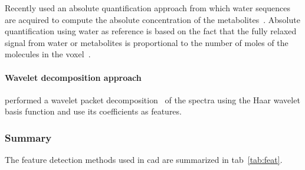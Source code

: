 Recently \citeauthor{trigui2017automatic} used an absolute quantification approach from which water sequences are acquired to compute the absolute concentration of the metabolites~\cite{trigui2016classification,trigui2017automatic}.
Absolute quantification using water as reference is based on the fact that the fully relaxed signal from water or metabolites is proportional to the number of moles of the molecules in the voxel~\cite{gasparovic2006use}.

\paragraph{Wavelet decomposition approach} 
\citeauthor{Tiwari2012} performed a wavelet packet decomposition~\cite{Coifman1992} of the spectra using the Haar wavelet basis function and use its coefficients as features.

\subsubsection{Summary}

The feature detection methods used in \ac{cad} are summarized in \acs{tab}~\ref{tab:feat}.  


